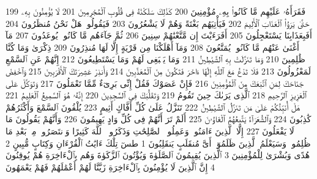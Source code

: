 {\tiny\colorbox{cl_aya}{199}} فَقَرَأَهُۥ عَلَيْهِم مَّا كَانُوا۟ بِهِۦ مُؤْمِنِينَ
{\tiny\colorbox{cl_aya}{200}} كَذَٰلِكَ سَلَكْنَٰهُ فِى قُلُوبِ ٱلْمُجْرِمِينَ
{\tiny\colorbox{cl_aya}{201}} لَا يُؤْمِنُونَ بِهِۦ حَتَّىٰ يَرَوُا۟ ٱلْعَذَابَ ٱلْأَلِيمَ
{\tiny\colorbox{cl_aya}{202}} فَيَأْتِيَهُم بَغْتَةً وَهُمْ لَا يَشْعُرُونَ
{\tiny\colorbox{cl_aya}{203}} فَيَقُولُوا۟ هَلْ نَحْنُ مُنظَرُونَ
{\tiny\colorbox{cl_aya}{204}} أَفَبِعَذَابِنَا يَسْتَعْجِلُونَ
{\tiny\colorbox{cl_aya}{205}} أَفَرَءَيْتَ إِن مَّتَّعْنَٰهُمْ سِنِينَ
{\tiny\colorbox{cl_aya}{206}} ثُمَّ جَآءَهُم مَّا كَانُوا۟ يُوعَدُونَ
{\tiny\colorbox{cl_aya}{207}} مَآ أَغْنَىٰ عَنْهُم مَّا كَانُوا۟ يُمَتَّعُونَ
{\tiny\colorbox{cl_aya}{208}} وَمَآ أَهْلَكْنَا مِن قَرْيَةٍ إِلَّا لَهَا مُنذِرُونَ
{\tiny\colorbox{cl_aya}{209}} ذِكْرَىٰ وَمَا كُنَّا ظَٰلِمِينَ
{\tiny\colorbox{cl_aya}{210}} وَمَا تَنَزَّلَتْ بِهِ ٱلشَّيَٰطِينُ
{\tiny\colorbox{cl_aya}{211}} وَمَا يَنۢبَغِى لَهُمْ وَمَا يَسْتَطِيعُونَ
{\tiny\colorbox{cl_aya}{212}} إِنَّهُمْ عَنِ ٱلسَّمْعِ لَمَعْزُولُونَ
{\tiny\colorbox{cl_aya}{213}} فَلَا تَدْعُ مَعَ ٱللَّهِ إِلَٰهًا ءَاخَرَ فَتَكُونَ مِنَ ٱلْمُعَذَّبِينَ
{\tiny\colorbox{cl_aya}{214}} وَأَنذِرْ عَشِيرَتَكَ ٱلْأَقْرَبِينَ
{\tiny\colorbox{cl_aya}{215}} وَٱخْفِضْ جَنَاحَكَ لِمَنِ ٱتَّبَعَكَ مِنَ ٱلْمُؤْمِنِينَ
{\tiny\colorbox{cl_aya}{216}} فَإِنْ عَصَوْكَ فَقُلْ إِنِّى بَرِىٓءٌ مِّمَّا تَعْمَلُونَ
{\tiny\colorbox{cl_aya}{217}} وَتَوَكَّلْ عَلَى ٱلْعَزِيزِ ٱلرَّحِيمِ
{\tiny\colorbox{cl_aya}{218}} ٱلَّذِى يَرَىٰكَ حِينَ تَقُومُ
{\tiny\colorbox{cl_aya}{219}} وَتَقَلُّبَكَ فِى ٱلسَّٰجِدِينَ
{\tiny\colorbox{cl_aya}{220}} إِنَّهُۥ هُوَ ٱلسَّمِيعُ ٱلْعَلِيمُ
{\tiny\colorbox{cl_aya}{221}} هَلْ أُنَبِّئُكُمْ عَلَىٰ مَن تَنَزَّلُ ٱلشَّيَٰطِينُ
{\tiny\colorbox{cl_aya}{222}} تَنَزَّلُ عَلَىٰ كُلِّ أَفَّاكٍ أَثِيمٍ
{\tiny\colorbox{cl_aya}{223}} يُلْقُونَ ٱلسَّمْعَ وَأَكْثَرُهُمْ كَٰذِبُونَ
{\tiny\colorbox{cl_aya}{224}} وَٱلشُّعَرَآءُ يَتَّبِعُهُمُ ٱلْغَاوُۥنَ
{\tiny\colorbox{cl_aya}{225}} أَلَمْ تَرَ أَنَّهُمْ فِى كُلِّ وَادٍ يَهِيمُونَ
{\tiny\colorbox{cl_aya}{226}} وَأَنَّهُمْ يَقُولُونَ مَا لَا يَفْعَلُونَ
{\tiny\colorbox{cl_aya}{227}} إِلَّا ٱلَّذِينَ ءَامَنُوا۟ وَعَمِلُوا۟ ٱلصَّٰلِحَٰتِ وَذَكَرُوا۟ ٱللَّهَ كَثِيرًا وَٱنتَصَرُوا۟ مِنۢ بَعْدِ مَا ظُلِمُوا۟ وَسَيَعْلَمُ ٱلَّذِينَ ظَلَمُوٓا۟ أَىَّ مُنقَلَبٍ يَنقَلِبُونَ
{\tiny\colorbox{cl_aya}{1}} طسٓ تِلْكَ ءَايَٰتُ ٱلْقُرْءَانِ وَكِتَابٍ مُّبِينٍ
{\tiny\colorbox{cl_aya}{2}} هُدًى وَبُشْرَىٰ لِلْمُؤْمِنِينَ
{\tiny\colorbox{cl_aya}{3}} ٱلَّذِينَ يُقِيمُونَ ٱلصَّلَوٰةَ وَيُؤْتُونَ ٱلزَّكَوٰةَ وَهُم بِٱلْءَاخِرَةِ هُمْ يُوقِنُونَ
{\tiny\colorbox{cl_aya}{4}} إِنَّ ٱلَّذِينَ لَا يُؤْمِنُونَ بِٱلْءَاخِرَةِ زَيَّنَّا لَهُمْ أَعْمَٰلَهُمْ فَهُمْ يَعْمَهُونَ

